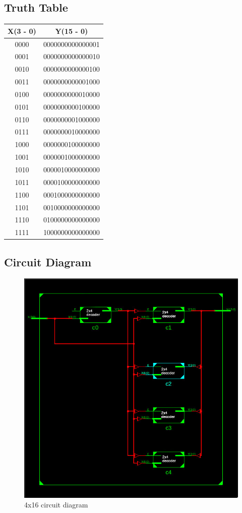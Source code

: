 \documentclass[titlepage]{article}
\begin{document}
    \subsection{Truth Table}
    \begin{tabular}{| c | c |}
        \hline
        X(3 - 0) & Y(15 - 0) \\
        \hline
        0000 & 0000000000000001 \\
        0001 & 0000000000000010 \\
        0010 & 0000000000000100 \\
        0011 & 0000000000001000 \\
        0100 & 0000000000010000 \\
        0101 & 0000000000100000 \\
        0110 & 0000000001000000 \\
        0111 & 0000000010000000 \\
        1000 & 0000000100000000 \\
        1001 & 0000001000000000 \\
        1010 & 0000010000000000 \\
        1011 & 0000100000000000 \\
        1100 & 0001000000000000 \\
        1101 & 0010000000000000 \\
        1110 & 0100000000000000 \\
        1111 & 1000000000000000 \\
        \hline
    \end{tabular}
    \subsection{Circuit Diagram}
    \begin{figure}[!ht]
        \centering
        \includegraphics[width=15cm]{./figures/4x16.jpeg}
        \caption{4x16 circuit diagram}
    \end{figure}
\end{document}
